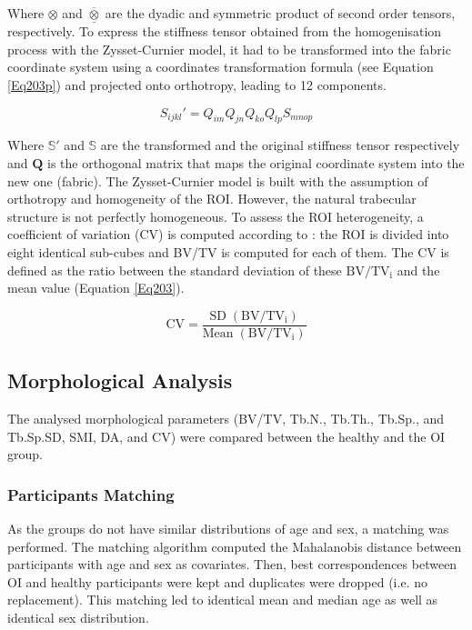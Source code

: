 \documentclass[a4paper,fleqn]{DC_ArtStyle}
\begin{document}
Where $\otimes$ and $\overline{\underline{\otimes}}$ are the dyadic and symmetric product of second order tensors, respectively. To express the stiffness tensor obtained from the homogenisation process with the Zysset-Curnier model, it had to be transformed into the fabric coordinate system using a coordinates transformation formula (see Equation \ref{Eq203p}) and projected onto orthotropy, leading to 12 components. 

\begin{equation}
	S_{ijkl}' = Q_{im}Q_{jn}Q_{ko}Q_{lp} S_{mnop}
	\label{Eq203p}
\end{equation}

Where $\mathbb{S}'$ and $\mathbb{S}$ are the transformed and the original stiffness tensor respectively and $\mathbf{Q}$ is the orthogonal matrix that maps the original coordinate system into the new one (fabric). The Zysset-Curnier model is built with the assumption of orthotropy and homogeneity of the ROI. However, the natural trabecular structure is not perfectly homogeneous. To assess the ROI heterogeneity, a coefficient of variation (CV) is computed according to \citeauthor{Panyasantisuk2015}\cite{Panyasantisuk2015}: the ROI is divided into eight identical sub-cubes and BV/TV is computed for each of them. The CV is defined as the ratio between the standard deviation of these $\mathrm{BV/TV_i}$ and the mean value (Equation \ref{Eq203}).

\begin{equation}
	\mathrm{CV} = \frac{\mathrm{SD\;(BV/TV_i)}}{\mathrm{Mean\;(BV/TV_i)}}
	\label{Eq203}
\end{equation}

\subsection{Morphological Analysis}
The analysed morphological parameters (BV/TV, Tb.N., Tb.Th., Tb.Sp., and Tb.Sp.SD, SMI, DA, and CV) were compared between the healthy and the OI group.

\subsubsection{Participants Matching}
As the groups do not have similar distributions of age and sex, a matching was performed. The matching algorithm computed the Mahalanobis distance between participants with age and sex as covariates. Then, best correspondences between OI and healthy participants were kept and duplicates were dropped (i.e. no replacement)\cite{Stuart2010}. This matching led to identical mean and median age as well as identical sex distribution.
\end{document}
